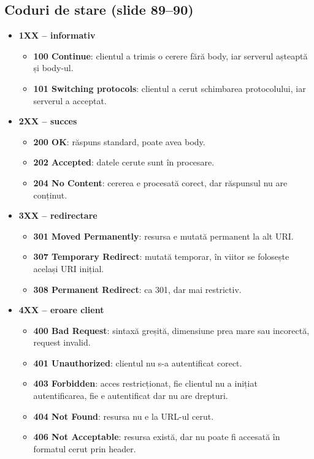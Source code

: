 \documentclass[11pt,a4paper]{article}
\begin{document}
\subsection*{Coduri de stare (slide 89--90)}
\begin{itemize}
  \item \textbf{1XX -- informativ}
  \begin{itemize}
    \item \textbf{100 Continue}: clientul a trimis o cerere fără body, iar serverul așteaptă și body-ul.
    \item \textbf{101 Switching protocols}: clientul a cerut schimbarea protocolului, iar serverul a acceptat.
  \end{itemize}
  \item \textbf{2XX -- succes}
  \begin{itemize}
    \item \textbf{200 OK}: răspuns standard, poate avea body.
    \item \textbf{202 Accepted}: datele cerute sunt în procesare.
    \item \textbf{204 No Content}: cererea e procesată corect, dar răspunsul nu are conținut.
  \end{itemize}
  \item \textbf{3XX -- redirectare}
  \begin{itemize}
    \item \textbf{301 Moved Permanently}: resursa e mutată permanent la alt URI.
    \item \textbf{307 Temporary Redirect}: mutată temporar, în viitor se folosește același URI inițial.
    \item \textbf{308 Permanent Redirect}: ca 301, dar mai restrictiv.
  \end{itemize}
  \item \textbf{4XX -- eroare client}
  \begin{itemize}
    \item \textbf{400 Bad Request}: sintaxă greșită, dimensiune prea mare sau incorectă, request invalid.
    \item \textbf{401 Unauthorized}: clientul nu s-a autentificat corect.
    \item \textbf{403 Forbidden}: acces restricționat, fie clientul nu a inițiat autentificarea, fie e autentificat dar nu are drepturi.
    \item \textbf{404 Not Found}: resursa nu e la URL-ul cerut.
    \item \textbf{406 Not Acceptable}: resursa există, dar nu poate fi accesată în formatul cerut prin header.

\end{itemize}
\end{itemize}
\end{document}
